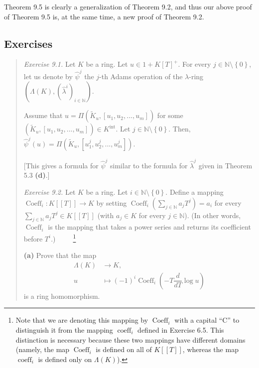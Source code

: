 \documentclass[numbers=enddot,12pt,final,onecolumn,notitlepage]{scrartcl}%
\begin{document}
Theorem 9.5 is clearly a generalization of Theorem 9.2, and thus our above
proof of Theorem 9.5 is, at the same time, a new proof of Theorem 9.2.

\subsection{Exercises}

\begin{quotation}
\textit{Exercise 9.1.} Let $K$ be a ring. Let $u\in1+K\left[  T\right]  ^{+}$.
For every $j\in\mathbb{N}\setminus\left\{  0\right\}  $, let us denote by
$\widehat{\psi}^{j}$ the $j$-th Adams operation of the $\lambda$-ring $\left(
\Lambda\left(  K\right)  ,\left(  \widehat{\lambda}^{i}\right)  _{i\in
\mathbb{N}}\right)  $.

Assume that $u=\Pi\left(  \widetilde{K}_{u},\left[  u_{1},u_{2},...,u_{m}%
\right]  \right)  $ for some $\left(  \widetilde{K}_{u},\left[  u_{1}%
,u_{2},...,u_{m}\right]  \right)  \in K^{\operatorname*{int}}$. Let
$j\in\mathbb{N}\setminus\left\{  0\right\}  $. Then, $\widehat{\psi}%
^{j}\left(  u\right)  =\Pi\left(  \widetilde{K}_{u},\left[  u_{1}^{j}%
,u_{2}^{j},...,u_{m}^{j}\right]  \right)  $.

[This gives a formula for $\widehat{\psi}^{j}$ similar to the formula for
$\widehat{\lambda}^{j}$ given in Theorem 5.3 \textbf{(d)}.]

\textit{Exercise 9.2.} Let $K$ be a ring. Let $i\in\mathbb{N}\setminus\left\{
0\right\}  $. Define a mapping $\operatorname*{Coeff}\nolimits_{i}:K\left[
\left[  T\right]  \right]  \rightarrow K$ by setting $\operatorname*{Coeff}%
\nolimits_{i}\left(  \sum\limits_{j\in\mathbb{N}}a_{j}T^{j}\right)  =a_{i}$
for every $\sum\limits_{j\in\mathbb{N}}a_{j}T^{j}\in K\left[  \left[
T\right]  \right]  $ (with $a_{j}\in K$ for every $j\in\mathbb{N}$). (In other
words, $\operatorname*{Coeff}\nolimits_{i}$ is the mapping that takes a power
series and returns its coefficient before $T^{i}$.)\ \ \ \ \ \footnote{Note
that we are denoting this mapping by $\operatorname*{Coeff}\nolimits_{i}$ with
a capital ``C'' to distinguish it from the mapping $\operatorname*{coeff}%
\nolimits_{i}$ defined in Exercise 6.5. This distinction is necessary because
these two mappings have different domains (namely, the map
$\operatorname*{Coeff}\nolimits_{i}$ is defined on all of $K\left[  \left[
T\right]  \right]  $, whereas the map $\operatorname*{coeff}\nolimits_{i}$ is
defined only on $\Lambda\left(  K\right)  $).}

\textbf{(a)} Prove that the map%
\begin{align*}
\Lambda\left(  K\right)   &  \rightarrow K,\\
u  &  \mapsto\left(  -1\right)  ^{i}\operatorname*{Coeff}\nolimits_{i}\left(
-T\dfrac{d}{dT}\log u\right)
\end{align*}
is a ring homomorphism.


\end{quotation}
\end{document}
